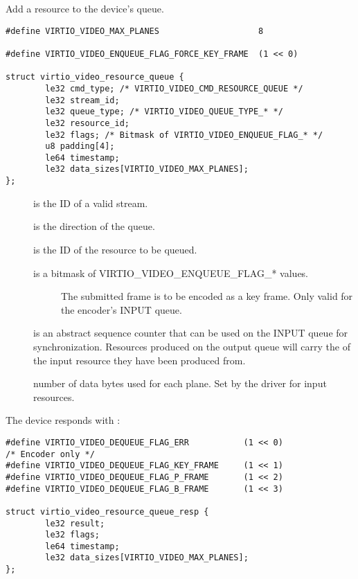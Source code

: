 Add a resource to the device's queue.

\begin{lstlisting}
#define VIRTIO_VIDEO_MAX_PLANES                    8

#define VIRTIO_VIDEO_ENQUEUE_FLAG_FORCE_KEY_FRAME  (1 << 0)

struct virtio_video_resource_queue {
        le32 cmd_type; /* VIRTIO_VIDEO_CMD_RESOURCE_QUEUE */
        le32 stream_id;
        le32 queue_type; /* VIRTIO_VIDEO_QUEUE_TYPE_* */
        le32 resource_id;
        le32 flags; /* Bitmask of VIRTIO_VIDEO_ENQUEUE_FLAG_* */
        u8 padding[4];
        le64 timestamp;
        le32 data_sizes[VIRTIO_VIDEO_MAX_PLANES];
};
\end{lstlisting}

\begin{description}
\item[]
is the ID of a valid stream.
\item[]
is the direction of the queue.
\item[]
is the ID of the resource to be queued.
\item[]
is a bitmask of VIRTIO_VIDEO_ENQUEUE_FLAG_* values.

\begin{description}
\item[]
The submitted frame is to be encoded as a key frame. Only valid for the
encoder's INPUT queue.
\end{description}
\item[]
is an abstract sequence counter that can be used on the INPUT queue for
synchronization. Resources produced on the output queue will carry the
 of the input resource they have been produced from.
\item[]
number of data bytes used for each plane. Set by the driver for input
resources.
\end{description}

The device responds with
:

\begin{lstlisting}
#define VIRTIO_VIDEO_DEQUEUE_FLAG_ERR           (1 << 0)
/* Encoder only */
#define VIRTIO_VIDEO_DEQUEUE_FLAG_KEY_FRAME     (1 << 1)
#define VIRTIO_VIDEO_DEQUEUE_FLAG_P_FRAME       (1 << 2)
#define VIRTIO_VIDEO_DEQUEUE_FLAG_B_FRAME       (1 << 3)

struct virtio_video_resource_queue_resp {
        le32 result;
        le32 flags;
        le64 timestamp;
        le32 data_sizes[VIRTIO_VIDEO_MAX_PLANES];
};
\end{lstlisting}

